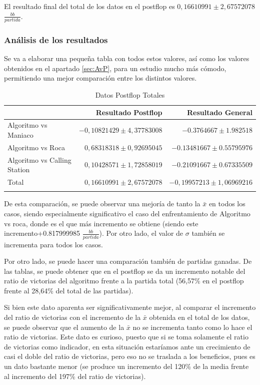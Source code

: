El resultado final del total de los datos en el postflop es  $0,16610991\pm 2,67572078 $$\frac{bb}{partida}$.

\subsubsection{Análisis de los resultados}

Se va a elaborar una pequeña tabla con todos estos valores, así como los valores obtenidos en el apartado \ref{sec:AvP}, para un estudio mucho más cómodo, permitiendo una mejor comparación entre los distintos valores.

\begin{longtable}[c]{lrr}
\hline 
 & Resultado Postflop & Resultado General \\ \hline
Algoritmo vs Maniaco & $-0,10821429\pm4,37783008 $ &  $-0.3764667\pm1.982518$ \\
Algoritmo vs Roca & $ 0,68318318\pm 0,92695045 $  &  $-0.13481667\pm0.55795976$  \\
Algoritmo vs Calling Station &$0,10428571\pm 1,72858019 $  & $-0.21091667\pm0.67335509$ \\
Total & $0,16610991\pm 2,67572078$ & $-0,19957213\pm1,06969216$\\ \hline
\caption{Datos Postflop Totales}
\label{tab:DPFT}
\end{longtable}

De esta comparación, se puede observar una mejoría de tanto la $\bar{x}$ en todos los casos, siendo especialmente significativo el caso del enfrentamiento de Algoritmo vs roca, donde es el que más incremento se obtiene (siendo este incremento+0.817999985 $\frac{bb}{partida}$). Por otro lado, el valor de $\sigma$ también se incrementa para todos los casos.

Por otro lado, se puede hacer una comparación también de partidas ganadas. De las tablas, se puede obtener que en el postflop se da un incremento notable del ratio de victorias del algoritmo frente a la partida total (56,57\% en el postflop frente al 28,64\% del total de las partidas). 

Si bien este dato aparenta ser significativamente mejor, al comparar el incremento del ratio de victorias con el incremento de la $\bar{x}$ obtenida en el total de los datos, se puede observar que el aumento de la $\bar{x}$ no se incrementa tanto como lo hace el ratio de victorias. Este dato es curioso, puesto que si se toma solamente el ratio de victorias como indicador, en esta situación estaríamos ante un crecimiento de casi el doble del ratio de victorias, pero eso no se traslada a los beneficios, pues es un dato bastante menor (se produce un incremento del 120\% de la media frente al incremento del 197\% del ratio de victorias). 

